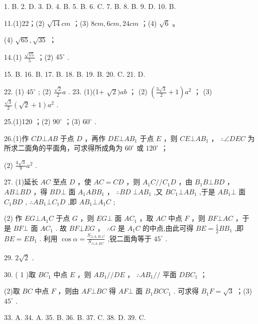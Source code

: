 \documentclass[10pt]{article}
\newcommand*\circled[1]{\tikz[baseline=(char.base)]{\node[shape=circle,draw,inner sep=1.5pt] (char) {\small #1};}}
\begin{document}
1. B. 2. D. 3. D. 4. B. 5. B. 6. C. 7. B. 8. B. 9. D. 10. B.

11.(1)22；(2) \({\sqrt{14}{cm}}\) ；(3) \({8cm},{6cm},{24cm}\) ；(4) \(\sqrt{6}\) 。

(4) \(\sqrt{65},\sqrt{35}\) ；

14.(1) \(\frac{\sqrt{15}}{5}\) ；(2) \({45}^{ \circ  }\) .

15. B. 16. B. 17. B. 18. B. 19. B. 20. C. 21. D.

22. (1) \({45}^{ \circ  }\) ; (2) \(\frac{\sqrt{2}}{2}a\) . 23. (1)(1+ \(\sqrt{2}){ab}\) ； (2) \(\left( {\frac{3\sqrt{3}}{2} + 1}\right) {a}^{2}\) ； (3) \(\frac{\sqrt{3}}{2}\left( {\sqrt{2} + 1}\right) {a}^{2}\) .

25.(1)120 \textdegree ；(2) \({90}^{ \circ  }\) ；(3) \({60}^{ \circ  }\) .

26.(1)作 \({CD} \bot  {AB}\) 于点 \(D\) ，再作 \({DE} \bot  A{B}_{1}\) 于点 \(E\) ，则 \({CE} \bot  A{B}_{1}\) ， \(\therefore \angle {DEC}\) 为所求二面角的平面角，可求得所成角为 \({60}^{ \circ  }\) 或 \({120}^{ \circ  }\) ；

(2) \(\frac{4\sqrt{3}}{9}{a}^{2}\) .

27. (1)延长 \({AC}\) 至点 \(D\) ，使 \({AC} = {CD}\) ，则 \({A}_{1}C//{C}_{1}D\) ，由 \({B}_{1}B\bot {BD}\) ， \({AB}\bot {BD}\) ，得 \({BD}\bot\) 面 \({A}_{1}{AB}{B}_{1}\) ， \(\therefore {BD} \; \bot  A{B}_{1}\) ,又 \(B{C}_{1} \bot  A{B}_{1}\) ,于是 \(A{B}_{1} \bot\) 面 \({C}_{1}{BD}\) , \(\therefore A{B}_{1} \bot  {C}_{1}D\) ,即 \(A{B}_{1} \bot  {A}_{1}C\) ;

(2) \circled{1}  作 \({EG} \bot  {A}_{1}C\) 于点 \(G\) ，则 \({EG} \bot\) 面 \(A{C}_{1}\) ，取 \({AC}\) 中点 \(F\) ，则 \({BF} \bot  {AC}\) ，于是 \({BF} \bot\) 面 \(A{C}_{1}\) . 故 \({BF}\underline{ \bot  }{EG}\) ， \(\therefore G\) 是 \({A}_{1}C\) 的中点,由此可得 \({BE} = \frac{1}{2}B{B}_{1}\) ,即 \({BE} = E{B}_{1}\) .  \circled{2} 利用 \(\cos \alpha  = \frac{{S}_{\bigtriangleup A,B,C}}{{S}_{\bigtriangleup A,{EC}}}\) ,锐二面角等于 \({45}^{ \circ  }\) .

29. \(2\sqrt{2}\) .

30. ( 1 )取 \(B{C}_{1}\) 中点 \(E\) ，则 \(A{B}_{1}//{DE}\) ， \(\therefore A{B}_{1}//\) 平面 \({DB}{C}_{1}\) ；

(2)取 \({BC}\) 中点 \(F\) ，则由 \({AF}\bot {BC}\) 得 \({AF}\bot\) 面 \({B}_{1}{BC}{C}_{1}\) . 可求得 \({B}_{1}F = \sqrt{3}\) ；(3) \({45}^{ \circ  }\) .

33. A. 34. A. 35. B. 36. B. 37. C. 38. D. 39. C.
\end{document}

